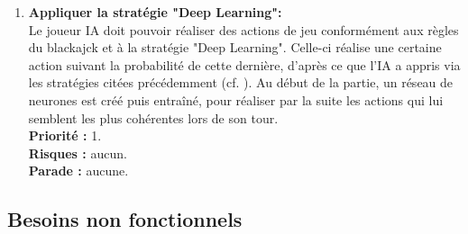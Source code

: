 \begin{enumerate}
    \item \textbf{Appliquer la stratégie "Deep Learning":} \\
        Le joueur IA doit pouvoir réaliser des actions de jeu conformément aux règles du blackajck et à la stratégie "Deep Learning". Celle-ci réalise une certaine action suivant la probabilité de cette dernière, d'après ce que l'IA a appris via les stratégies citées précédemment (cf. ). Au début de la partie, un réseau de neurones est créé puis entraîné, pour réaliser par la suite les actions qui lui semblent les plus cohérentes lors de son tour. \\
        \textbf{Priorité :} 1. \\
        \textbf{Risques :} aucun. \\ 
        \textbf{Parade :} aucune.
\end{enumerate}

\subsection{Besoins non fonctionnels}

